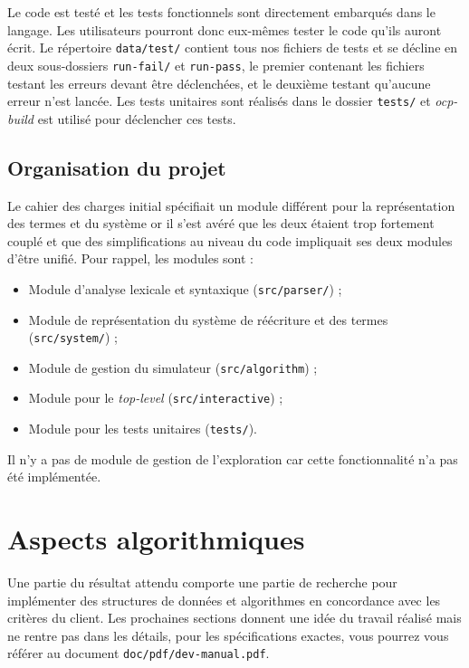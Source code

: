 \documentclass[12pt,a4paper]{article}
\begin{document}
Le code est testé et les tests fonctionnels sont directement embarqués dans le langage. Les utilisateurs pourront donc eux-mêmes tester le code qu'ils auront écrit. Le répertoire \verb=data/test/= contient tous nos fichiers de tests et se décline en deux sous-dossiers \verb=run-fail/= et \verb=run-pass=, le premier contenant les fichiers testant les erreurs devant être déclenchées, et le deuxième testant qu'aucune erreur n'est lancée. Les tests unitaires sont réalisés dans le dossier \verb=tests/= et \textit{ocp-build} est utilisé pour déclencher ces tests.

\subsection{Organisation du projet}

Le cahier des charges initial spécifiait un module différent pour la représentation des termes et du système or il s'est avéré que les deux étaient trop fortement couplé et que des simplifications au niveau du code impliquait ses deux modules d'être unifié. Pour rappel, les modules sont :
\newline

\begin{itemize}
\item Module d'analyse lexicale et syntaxique (\verb=src/parser/=) ;
\item Module de représentation du système de réécriture et des termes (\verb=src/system/=) ;
\item Module de gestion du simulateur (\verb=src/algorithm=) ;
\item Module pour le \textit{top-level} (\verb=src/interactive=) ;
\item Module pour les tests unitaires (\verb=tests/=).
\end{itemize}
\vspace{10pt}

Il n'y a pas de module de gestion de l'exploration car cette fonctionnalité n'a pas été implémentée.

\section{Aspects algorithmiques}

Une partie du résultat attendu comporte une partie de recherche pour implémenter des structures de données et algorithmes en concordance avec les critères du client. Les prochaines sections donnent une idée du travail réalisé mais ne rentre pas dans les détails, pour les spécifications exactes, vous pourrez vous référer au document \verb=doc/pdf/dev-manual.pdf=.
\end{document}
